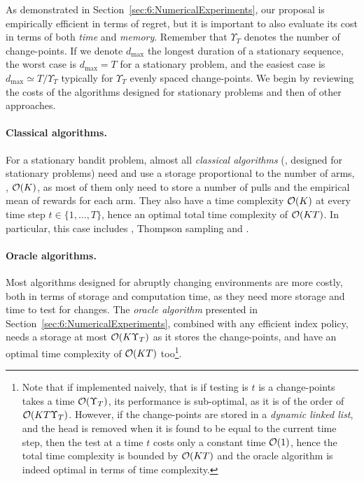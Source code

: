 As demonstrated in Section~\ref{sec:6:NumericalExperiments}, our proposal is empirically efficient in terms of regret, but it is important to also evaluate its cost in terms of both \emph{time} and \emph{memory}.
Remember that $\Upsilon_T$ denotes the number of change-points.
If we denote $d_{\max}$ the longest duration of a stationary sequence, the worst case is $d_{\max} = T$ for a stationary problem, and the easiest case is $d_{\max} \simeq T / \Upsilon_T$ typically for $\Upsilon_T$ evenly spaced change-points.
%
We begin by reviewing the costs of the algorithms designed for stationary problems and then of other approaches.


\paragraph{Classical algorithms.}
%
For a stationary bandit problem, almost all \emph{classical algorithms} (\ie, designed for stationary problems) need and use a storage proportional to the number of arms, \ie, $\mathop{}\mathopen{}\mathcal{O}\mathopen{}\left(K\right)$, as most of them only need to store a number of pulls and the empirical mean of rewards for each arm.
They also have a time complexity $\mathop{}\mathopen{}\mathcal{O}\mathopen{}\left(K\right)$ at every time step $t\in\{1,\dots,T\}$, hence an optimal total time complexity of $\mathop{}\mathopen{}\mathcal{O}\mathopen{}\left(KT\right)$.
In particular, this case includes \UCB, Thompson sampling and \klUCB.

\paragraph{Oracle algorithms.}
%
Most algorithms designed for abruptly changing environments are more costly, both in terms of storage and computation time, as they need more storage and time to test for changes.
The \emph{oracle algorithm} presented in Section~\ref{sec:6:NumericalExperiments}, combined with any efficient index policy, needs a storage at most $\mathop{}\mathopen{}\mathcal{O}\mathopen{}\left(K \Upsilon_T\right)$ as it stores the change-points, and have an optimal time complexity of $\mathop{}\mathopen{}\mathcal{O}\mathopen{}\left(K T\right)$
too\footnote{Note that if implemented naively, that is if testing is $t$ is a change-points takes a time $\mathop{}\mathopen{}\mathcal{O}\mathopen{}\left(\Upsilon_T\right)$, its performance is sub-optimal, as it is of the order of $\mathop{}\mathopen{}\mathcal{O}\mathopen{}\left(K T \Upsilon_T\right)$. However, if the change-points are stored in a \emph{dynamic linked list}, and the head is removed when it is found to be equal to the current time step, then the test at a time $t$ costs only a constant time $\mathop{}\mathopen{}\mathcal{O}\mathopen{}\left(1\right)$, hence the total time complexity is bounded by $\mathop{}\mathopen{}\mathcal{O}\mathopen{}\left(K T\right)$ and the oracle algorithm is indeed optimal in terms of time complexity.}.

